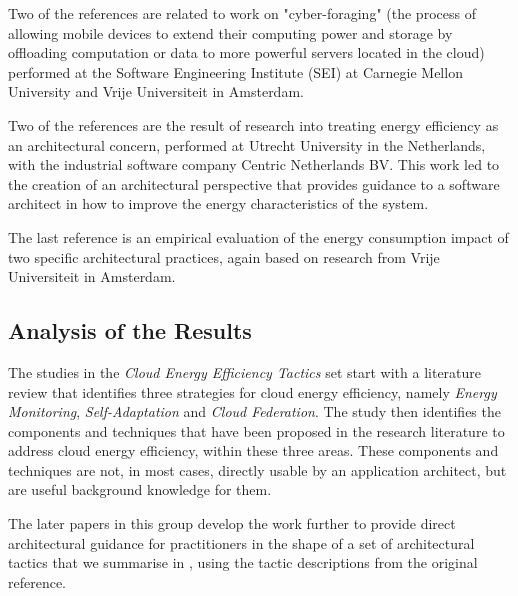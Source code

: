 Two of the references \cite{lewis2015-foragingtactics, lewis2016-foragingdm} are related to work on "cyber-foraging" (the process of allowing mobile devices to extend their computing power and storage by offloading computation or data to more powerful servers located in the cloud) performed at the Software Engineering Institute (SEI) at Carnegie Mellon University and  Vrije Universiteit in Amsterdam.

Two of the references \cite{jagroep2015-energyperspective, jagroep2017-energyperspective} are the result of research into treating energy efficiency as an architectural concern, performed at Utrecht University in the Netherlands, with the industrial software company Centric Netherlands BV.  This work led to the creation of an architectural perspective \cite{woods2005-perspectives} that provides guidance to a software architect in how to improve the energy characteristics of the system.

The last reference \cite{procaccianti2016-twobestpractices} is an empirical evaluation of the energy consumption impact of two specific architectural practices, again based on research from Vrije Universiteit in Amsterdam.

\subsection{Analysis of the Results}

The studies in the \emph{Cloud Energy Efficiency Tactics} set start with a literature review \cite{procaccianti2013-cloudenergyefficiency} that identifies three strategies for cloud energy efficiency, namely \emph{Energy Monitoring}, \emph{Self-Adaptation} and \emph{Cloud Federation}.  The study then identifies the components and techniques that have been proposed in the research literature to address cloud energy efficiency, within these three areas.  These components and techniques are not, in most cases, directly usable by an application architect, but are useful background knowledge for them.

The later papers in this group develop the work further to provide direct architectural guidance for practitioners in the shape of a set of architectural tactics that we summarise in , using the tactic descriptions from the original reference.

